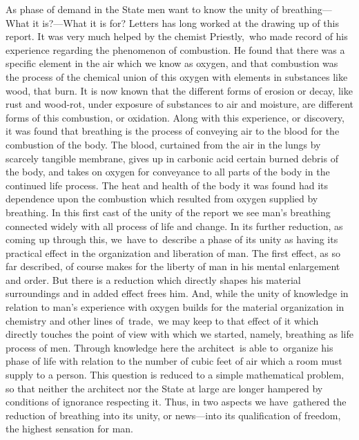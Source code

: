 \documentclass[openany,nobib]{tufte-book}
\begin{document}
As phase of demand in the State men want to know the unity of
breathing---What it is?---What it is for? Letters has long worked at the
drawing up of this report. It was very much helped by the chemist
Priestly,~who made record of his experience regarding the phenomenon of
combustion. He found that there was a specific element in the air which
we know as oxygen, and that combustion was the process of the chemical
union of this oxygen with elements in substances like wood, that burn.
It is now known that the different forms of erosion or decay, like rust
and wood-rot, under exposure of substances to air and moisture, are
different forms of this combustion, or oxidation. Along with this
experience, or discovery, it was found that breathing is the process of
conveying air to the blood for the combustion of the body. The blood,
curtained from the air in the lungs by scarcely tangible membrane, gives
up in carbonic acid certain burned debris of the body, and takes on
oxygen for conveyance to all parts of the body in the continued life
process. The heat and health of the body it was found had its dependence
upon the combustion which resulted from oxygen supplied by breathing. In
this first cast of the unity of the report we see man's breathing
connected widely with all process of life and change. In its further
reduction, as coming up through this, we~have to~describe a phase of its
unity as having its practical effect in the organization and liberation
of man. The first effect, as so far described, of course makes for the
liberty of man in his mental enlargement and order. But there is a
reduction which directly shapes his material surroundings and in added
effect frees him. And, while the unity of knowledge in relation to man's
experience with oxygen builds for the material organization in chemistry
and other lines of~trade,~we may keep to that effect of it which
directly touches the point of view with which we started, namely,
breathing as life process of men. Through knowledge here the
architect~is able to~organize his phase of life with relation to the
number of cubic feet of air which a room must supply to a person. This
question is reduced to a simple mathematical problem, so that neither
the architect nor the State at large are longer hampered by conditions
of ignorance respecting it. Thus, in two aspects we have~gathered the
reduction of breathing into its unity, or news---into its qualification
of freedom, the highest sensation for man.~
\end{document}
